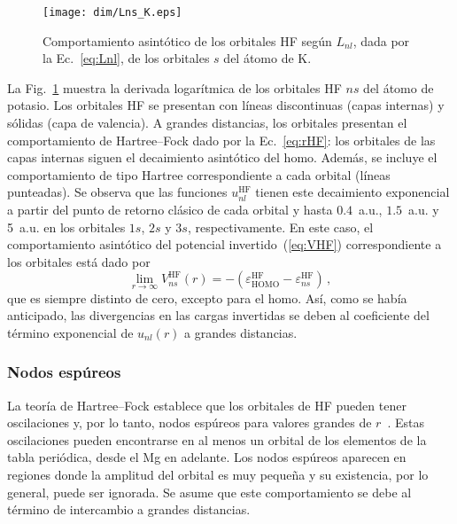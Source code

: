 \begin{figure}[t]
\centering
\texttt{[image: dim/Lns\_K.eps]} 
\caption[Comportamiento asintótico de los orbitales HF.]
{Comportamiento asintótico de los orbitales HF según $L_{nl}$, dada por 
la Ec.~\ref{eq:Lnl}, de los orbitales $s$ del átomo de K.}
\label{fig:LnsK}
\end{figure}

La Fig.~\ref{fig:LnsK} muestra la derivada logarítmica de los orbitales 
HF $ns$ del átomo de potasio. Los orbitales HF se presentan con líneas 
discontinuas (capas internas) y sólidas (capa de valencia). A grandes 
distancias, los orbitales presentan el comportamiento de Hartree--Fock 
dado por la Ec.~\ref{eq:rHF}: los orbitales de las capas internas siguen 
el decaimiento asintótico del \acs{homo}. Además, se incluye el 
comportamiento de tipo Hartree correspondiente a cada orbital (líneas 
punteadas). Se observa que las funciones $u_{nl}^{\mathrm{HF}}$ tienen 
este decaimiento exponencial a partir del punto de retorno clásico de 
cada orbital y hasta $0.4$~a.u., $1.5$~a.u. y 5~a.u. en los orbitales 
$1s$, $2s$ y $3s$, respectivamente. 
En este caso, el comportamiento asintótico del potencial 
invertido~(\ref{eq:VHF}) correspondiente a los orbitales está dado por
\begin{equation}
\lim_{r \rightarrow \infty} V_{ns}^{\mathrm{HF}}(r)=
-\left(\varepsilon_{\mathrm{HOMO}}^{\mathrm{HF}}
-\varepsilon_{ns}^{\mathrm{HF}}\right) \,,
\label{eq:asintoticoVHF}
\end{equation}
que es siempre distinto de cero, excepto para el \acs{homo}. Así, como 
se había anticipado, las divergencias en las cargas invertidas se deben 
al coeficiente del término exponencial de $u_{nl}(r)$ a grandes 
distancias. 

\subsubsection{Nodos espúreos}
\label{subsubsec:espureos}

La teoría de Hartree--Fock establece que los orbitales de HF pueden 
tener oscilaciones y, por lo tanto, nodos espúreos para valores grandes 
de $r$~\cite{FroeseFischer:97}. Estas oscilaciones pueden encontrarse en 
al menos un orbital de los elementos de la tabla periódica, desde el Mg 
en adelante. Los nodos espúreos aparecen en regiones donde la amplitud 
del orbital es muy pequeña y su existencia, por lo general, puede ser 
ignorada. Se asume que este comportamiento se debe al término de 
intercambio a grandes distancias.

